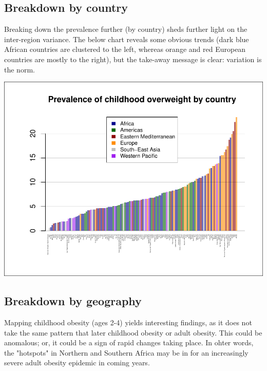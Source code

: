 \documentclass[11pt]{article}
\begin{document}
\begin{multicols}{2}
\subsection*{Breakdown by country}

Breaking down the prevalence further (by country) sheds further light on the inter-region variance.  The below chart reveals some obvious trends (dark blue African countries are clustered to the left, whereas orange and red European countries are mostly to the right), but the take-away message is clear: variation is the norm. \\

\begin{center}
\includegraphics{global_variance-006}
\end{center}

\subsection*{Breakdown by geography}
Mapping childhood obesity (ages 2-4) yields interesting findings, as it does not take the same pattern that later childhood obesity or adult obesity.  This could be anomalous; or, it could be a sign of rapid changes taking place.  In ohter words, the "hotspots" in Northern and Southern Africa may be in for an increasingly severe adult obesity epidemic in coming years.


\end{multicols}
\end{document}
